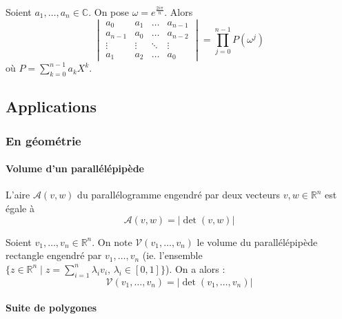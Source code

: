   \begin{example}
    Soient $a_1, \dots, a_n \in \mathbb{C}$. On pose $\omega = e^{\frac{2i\pi}{n}}$. Alors
    \[ \begin{vmatrix} a_0 & a_1 & \dots & a_{n-1} \\ a_{n-1} & a_0 & \dots & a_{n-2}\\ \vdots & \vdots & \ddots & \vdots \\ a_1 & a_2 & \dots & a_0 \end{vmatrix} = \prod_{j=0}^{n-1} P(\omega^j) \]
    où $P = \sum_{k=0}^{n-1} a_k X^k$.
  \end{example}

  \subsection{Applications}

  \subsubsection{En géométrie}

  \paragraph{Volume d'un parallélépipède}


  \begin{theorem}
    L'aire $\mathcal{A}(v,w)$ du parallélogramme engendré par deux vecteurs $v, w \in \mathbb{R}^n$ est égale à
    \[ \mathcal{A}(v,w) = \vert \det(v,w) \vert \]
  \end{theorem}

  \begin{corollary}
    Soient $v_1, \dots, v_n \in \mathbb{R}^n$. On note $\mathcal{V}(v_1, \dots, v_n)$ le volume du parallélépipède rectangle engendré par $v_1, \dots, v_n$ (ie. l'ensemble $\{ z \in \mathbb{R}^n \mid z = \sum_{i=1}^n \lambda_i v_i, \, \lambda_i \in [0,1] \}$). On a alors :
    \[ \mathcal{V}(v_1, \dots, v_n) = \vert \det(v_1, \dots, v_n) \vert \]
  \end{corollary}

  \paragraph{Suite de polygones}


